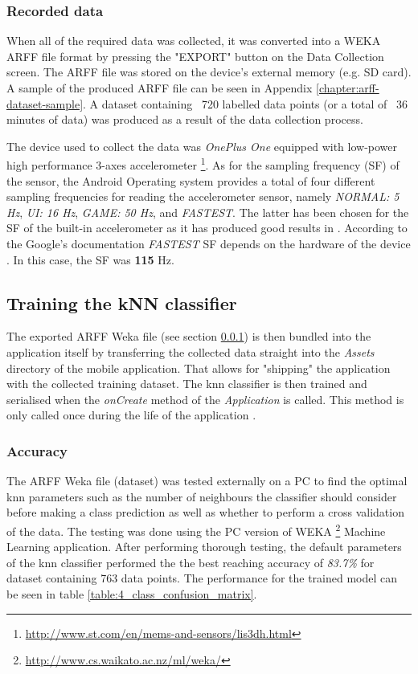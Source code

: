    \subsubsection{Recorded data}
    \label{subsubsection:recorded_data}
    When all of the required data was collected, it was converted into a WEKA ARFF file format by pressing the "EXPORT" button on the Data Collection screen. The ARFF file was stored on the device's external memory (e.g. SD card). A sample of the produced ARFF file can be seen in Appendix \ref{chapter:arff-dataset-sample}. A dataset containing ~720 labelled data points (or a total of ~36 minutes of data) was produced as a result of the data collection process. 
    
    The device used to collect the data was \textit{OnePlus One} equipped with low-power high performance 3-axes accelerometer \footnote{\url{http://www.st.com/en/mems-and-sensors/lis3dh.html}}. As for the sampling frequency (SF) of the sensor, the Android Operating system provides a total of four different sampling frequencies for reading the accelerometer sensor, namely \textit{NORMAL: 5 Hz}, \textit{UI: 16 Hz}, \textit{GAME: 50 Hz}, and \textit{FASTEST}. The latter has been chosen for the SF of the built-in accelerometer as it has produced good results in \citet[3-5]{lee2016}. According to the Google's documentation \textit{FASTEST} SF depends on the hardware of the device \citep{googlesensormanager2017}. In this case, the SF was \textbf{115} Hz. 
    
    \subsection{Training the kNN classifier}
    The exported ARFF Weka file (see section \ref{subsubsection:recorded_data}) is then bundled into the application itself by transferring the collected data straight into the \textit{Assets} directory of the mobile application. That allows for "shipping" the application with the collected training dataset. The \gls{knn} classifier is then trained and serialised when the \textit{onCreate} method of the \textit{Application} is called. This method is only called once during the life of the application \citep{googleapplication2017}.
    
    \subsubsection*{Accuracy}
    The ARFF Weka file (dataset) was tested externally on a PC to find the optimal \gls{knn} parameters such as the number of neighbours the classifier should consider before making a class prediction as well as whether to perform a cross validation of the data. The testing was done using the PC version of WEKA \footnote{\url{http://www.cs.waikato.ac.nz/ml/weka/}} Machine Learning application. After performing thorough testing, the default parameters of the \gls{knn} classifier performed the the best reaching accuracy of \textit{83.7\%} for dataset containing 763 data points. The performance for the trained model can be seen in table \ref{table:4_class_confusion_matrix}. 

